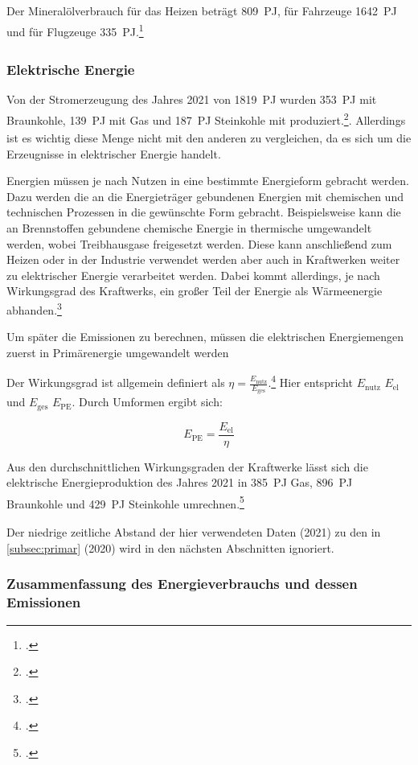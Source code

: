 \documentclass[12pt, ngerman]{article}
\newcommand{\pe}{_{\mathrm{PE}}}
\newcommand{\el}{_{\mathrm{el}}}
\begin{document}
Der Mineralölverbrauch für das Heizen beträgt \qty{809}{PJ\pe}, für Fahrzeuge \qty{1642}{PJ\pe}
und für Flugzeuge \qty{335}{PJ\pe}.\footcite{Energieflussbild2020PJLang, wilkeEndenergieverbrauchUndEnergieeffizienz2013}

\subsubsection{Elektrische Energie}

Von der Stromerzeugung des Jahres 2021 von \qty{1819}{PJ\el} wurden \qty{353}{PJ\el} mit Braunkohle, \qty{139}{PJ\el} mit Gas
und \qty{187}{PJ\el} Steinkohle mit produziert.\footcite{SMARDEntwicklungenIm}.
Allerdings ist es wichtig diese Menge nicht mit den anderen zu vergleichen, da es sich
um die Erzeugnisse in elektrischer Energie handelt.

Energien müssen je nach Nutzen in eine bestimmte Energieform gebracht werden.
Dazu werden die an die Energieträger gebundenen Energien mit chemischen und technischen
Prozessen in die gewünschte Form gebracht.
Beispielsweise kann die an Brennstoffen gebundene chemische Energie
in thermische umgewandelt werden, wobei Treibhausgase freigesetzt werden.
Diese kann anschließend zum Heizen oder in der Industrie verwendet werden
aber auch in Kraftwerken weiter zu elektrischer Energie verarbeitet werden.
Dabei kommt allerdings, je nach Wirkungsgrad des Kraftwerks,
ein großer Teil der Energie als Wärmeenergie abhanden.\footcite{AachenHatEnergie}

Um später die Emissionen zu berechnen, müssen die elektrischen Energiemengen zuerst in
Primärenergie umgewandelt werden

Der Wirkungsgrad \unit{\eta} ist allgemein definiert als
\(\eta=\frac{E_{\mathrm{nutz}}}{E_{\mathrm{ges}}}\).\footcite{WirkungsgradLEIFIphysik}
Hier entspricht \(E\mathrm{_{nutz}}\) \(E\el\) und \(E_\mathrm{{ges}}\) \(E\pe\). Durch Umformen ergibt sich:

\[E\pe=\frac{E\el}{\eta}\]

Aus den durchschnittlichen Wirkungsgraden der Kraftwerke lässt sich die
elektrische Energieproduktion des Jahres 2021 in \qty{385}{PJ\pe} Gas,
\qty{896}{PJ\pe} Braunkohle und \qty{429}{PJ\pe} Steinkohle umrechnen.\footcite{wilkeKraftwerkeKonventionelleUnd2013}

Der niedrige zeitliche Abstand der hier verwendeten Daten (2021) zu den in \cref{subsec:primar} (2020)
wird in den nächsten Abschnitten ignoriert.

\subsubsection{Zusammenfassung des Energieverbrauchs und dessen Emissionen}
\end{document}
